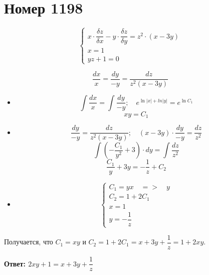 \section*{Номер 1198}

$$
    \begin{cases}
        x \cdot \dfrac{\delta z}{\delta x} - y \cdot \dfrac{\delta z}{\delta y} = z^2 \cdot (x - 3y) \\
        x = 1                                                                                        \\
        yz + 1 = 0
    \end{cases}
$$

\begin{solution}
    $$ \dfrac{dx}{x} = \dfrac{dy}{-y} = \dfrac{dz}{z^2 (x - 3y)} $$
    \begin{itemize}
        \item
              $$ \int \dfrac{dx}{x} = \int \dfrac{dy}{-y}; \quad e^{\ln|x| + ln|y|} = e^{\ln C_1} $$
              $$ xy = C_1 $$
        \item
              $$ \dfrac{dy}{-y} = \dfrac{dz}{z^2 (x - 3y)}; \quad (x - 3y) \cdot \dfrac{dy}{-y} = \dfrac{dz}{z^2} $$
              $$ \int (-\dfrac{C_1}{y^2} + 3) \cdot dy = \int \dfrac{dz}{z^2} $$
              $$ \dfrac{C_1}{y} + 3y = - \dfrac{1}{z} + C_2 $$
        \item
              $$
                  \begin{cases}
                      C_1 = yx \quad=>\quad y \\
                      C_2 = 1 + 2 C_1         \\
                      x = 1                   \\
                      y = - \dfrac{1}{z}
                  \end{cases}
              $$
    \end{itemize}
    Получается, что $ C_1 = xy $ и $ C_2 = 1 + 2C_1 = x + 3y + \dfrac{1}{z} = 1 + 2xy $. \par
    \textbf{Ответ: $ 2xy + 1 = x + 3y + \dfrac{1}{z} $}

\end{solution}


